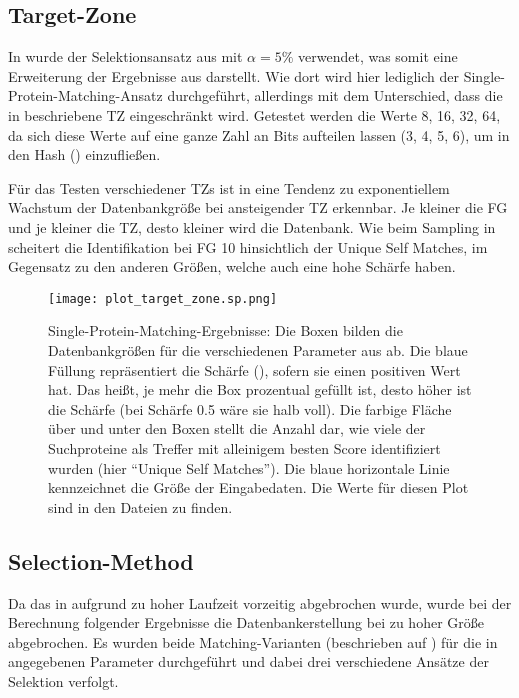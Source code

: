     \subsection{Target-Zone} %
        \label{sub:target_results}
        In  wurde der Selektionsansatz aus  mit $\alpha=5\%$ verwendet, was somit eine Erweiterung der Ergebnisse aus  darstellt. Wie dort wird hier lediglich der Single-Protein-Matching-Ansatz durchgeführt, allerdings mit dem Unterschied, dass die in  beschriebene \acl{TZ} eingeschränkt wird. Getestet werden die Werte 8, 16, 32, 64, da sich diese Werte auf eine ganze Zahl an Bits aufteilen lassen (3, 4, 5, 6), um in den Hash () einzufließen.

        Für das Testen verschiedener \acp{TZ} ist in  eine Tendenz zu exponentiellem Wachstum der Datenbankgröße bei ansteigender \ac{TZ} erkennbar. Je kleiner die \acl{FG} und je kleiner die \ac{TZ}, desto kleiner wird die Datenbank. Wie beim Sampling in  scheitert die Identifikation bei \ac{FG} 10 hinsichtlich der Unique Self Matches, im Gegensatz zu den anderen Größen, welche auch eine hohe Schärfe haben.

        \begin{figure}[H]
            \centering
            \texttt{[image: plot\_target\_zone.sp.png]}
            \caption[Single-Protein-Matching ]{Single-Protein-Matching-Ergebnisse: Die Boxen bilden die Datenbankgrößen für die verschiedenen Parameter aus  ab. Die blaue Füllung repräsentiert die Schärfe (), sofern sie einen positiven Wert hat. Das heißt, je mehr die Box prozentual gefüllt ist, desto höher ist die Schärfe (bei Schärfe 0.5 wäre sie halb voll). Die farbige Fläche über und unter den Boxen stellt die Anzahl dar, wie viele der Suchproteine als Treffer mit alleinigem besten Score identifiziert wurden (hier ``Unique Self Matches''). Die blaue horizontale Linie kennzeichnet die Größe der Eingabedaten. Die Werte für diesen Plot sind in den Dateien  zu finden.}
            \label{fig:target_zone.sp}
        \end{figure}

    \subsection{Selection-Method} %
        \label{sub:selection_results}
        Da das  in  aufgrund zu hoher Laufzeit vorzeitig abgebrochen wurde, wurde bei der Berechnung folgender Ergebnisse die Datenbankerstellung bei zu hoher Größe abgebrochen. Es wurden beide Matching-Varianten (beschrieben auf ) für die in  angegebenen Parameter durchgeführt und dabei drei verschiedene Ansätze der Selektion verfolgt.

